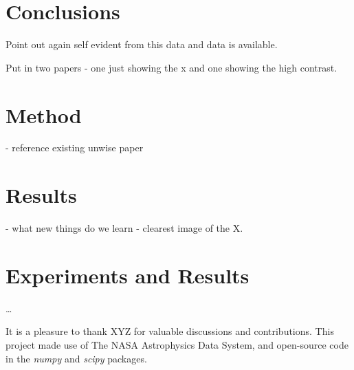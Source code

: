\documentclass[12pt, preprint]{aastex}
\newcommand{\project}[1]{\textsl{#1}}
\begin{document}
\section {Conclusions} 

Point out again self evident from this data and data is available. 

Put in two papers - one just showing the x and one showing the high contrast. 


\section{Method}
- reference existing unwise paper 

\section{Results}  
- what new things do we learn 
- clearest image of the X. 


\section{Experiments and Results}

\ldots 

\acknowledgments
It is a pleasure to thank
XYZ
for valuable discussions and contributions.
This project made use of
  The NASA Astrophysics Data System,
  and open-source code in the \project{numpy} and \project{scipy} packages.
\end{document}
